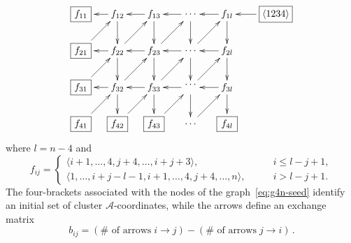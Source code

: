 \documentclass[11pt]{article}
\def\ket#1{\langle #1 \rangle}
\def\a{\mathcal{A}}
\begin{document}
\begin{equation}\label{eq:g4n-seed}
\begin{gathered}
\begin{xy} 0;<-.5pt,0pt>:<0pt,-.5pt>::
	(-100,0) *+{\framebox[8ex]{$\ket{1234}$}} ="-1",
	(0,0) *+{f_{1l}} ="0",
	(75,0) *+{\color{white} f_{00}} ="1",
	(150,0) *+{f_{13}} ="2",
	(225,0) *+{f_{12}} ="3",
	(300,0) *+{\framebox[5ex]{$f_{11}$}} ="4",
	(0,75) *+{f_{2l}} ="5",
	(75,75) *+{\color{white} f_{00}} ="6",
	(150,75) *+{f_{23}} ="7",
	(225,75) *+{f_{22}} ="8",
	(300,75) *+{\framebox[5ex]{$f_{21}$}} ="9",
	(0,150) *+{f_{3l}} ="10",
	(75,150) *+{\color{white} f_{00}} ="11",
	(150,150) *+{f_{33}} ="12",
	(225,150) *+{f_{32}} ="13",
	(300,150) *+{\framebox[5ex]{$f_{31}$}} ="14",
	(0,225) *+{\framebox[5ex]{$f_{4l}$}} ="15",
	(75,225) *+{\color{white} f_{00}} ="16",
	(150,225) *+{\framebox[5ex]{$f_{43}$}} ="17",
	(225,225) *+{\framebox[5ex]{$f_{42}$}} ="18",
	(300,225) *+{\framebox[5ex]{$f_{41}$}} ="19",
	(75,0) *+{\cdots} ="01",
	(75,75) *+{\cdots} ="06",
	(75,144) *+{\cdots} ="011",
	(75,225) *+{\cdots} ="016",
	"-1", {\ar"0"},
	"0", {\ar"1"},
	"0", {\ar"5"},
	"6", {\ar"0"},
	"1", {\ar"2"},
	"2", {\ar"3"},
	"2", {\ar"7"},
	"8", {\ar"2"},
	"3", {\ar"4"},
	"3", {\ar"8"},
	"9", {\ar"3"},
	"5", {\ar"6"},
	"6", {\ar"7"},
	"7", {\ar"8"},
	"8", {\ar"9"},
	"13", {\ar"7"},
	"7", {\ar"12"},
	"8", {\ar"13"},
	"5", {\ar"10"},
	"14", {\ar"8"},
	"10", {\ar"15"},
	"12", {\ar"17"},
	"19", {\ar"13"},
	"18", {\ar"12"},
	"13", {\ar"18"},
	"17", {\ar"11"},
	"16", {\ar"10"},
	"13", {\ar"14"},
	"12", {\ar"13"},
	"11", {\ar"12"},
	"10", {\ar"11"},
	"7", {\ar"1"},
	"11", {\ar"5"},
	"12", {\ar"6"},
	"1", {\ar"6"},
	"6", {\ar"11"},
	"11", {\ar"16"},
\end{xy}
\end{gathered} 
\end{equation}
where $l=n-4$ and 
\begin{equation}
  f_{i j} =
  \begin{cases}
    \langle i+1, \dotsc, 4, j + 4, \dotsc, i+j+3\rangle, \qquad &i \leq l-j+1,\\
    \langle 1, \dotsc, i+j-l-1, i+1, \dotsc, 4, j+4, \dotsc, n\rangle, \qquad &i >l-j+1.
  \end{cases}
\end{equation}
The four-brackets associated with the nodes of the graph~\eqref{eq:g4n-seed} identify an initial set of cluster $\a$-coordinates, while the arrows define an exchange matrix 
\begin{equation}
b_{i j} = (\# \text{ of arrows}\; i \to j) - (\# \text{ of arrows}\; j \to i) \, .
\label{eq:bijdef}
\end{equation}
\end{document}
